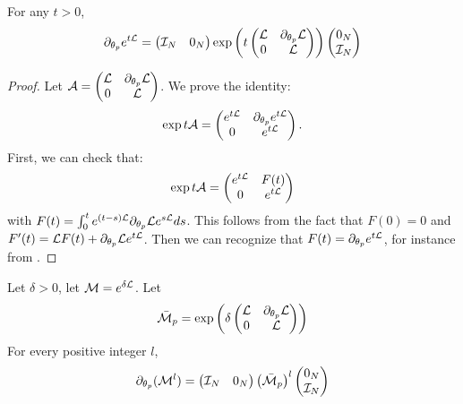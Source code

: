 \documentclass{article}
\begin{document}
\begin{lemma}
For any $t>0$, 
\begin{equation}
\partial_{\theta_p} e^{t{\mathcal L}}
=
\begin{pmatrix}
    {\mathcal I}_N & 0_N
\end{pmatrix}
\exp\left( t
\begin{pmatrix}
    {\mathcal L} &\partial_{\theta_p} {\mathcal L}
    \\
    0&{\mathcal L}
\end{pmatrix}
\right)
\begin{pmatrix}
    0_N 
    \\
    {\mathcal I}_N 
\end{pmatrix}
\end{equation}
\end{lemma}
\begin{proof}
Let ${\mathcal A}=\begin{pmatrix}
    {\mathcal L} &\partial_{\theta_p} {\mathcal L}
    \\
    0&{\mathcal L}
    \end{pmatrix}$.
We prove the identity:
\begin{equation}
    \exp t
    {\mathcal A}
    =
    \begin{pmatrix}
    e^{t{\mathcal L}} &\partial_{\theta_p} e^{t{\mathcal L}}
    \\
    0&e^{t{\mathcal L}}
    \end{pmatrix}.
\end{equation}
First, we can check that: 
\begin{equation}
    \exp t
    {\mathcal A}
    =
    \begin{pmatrix}
    e^{t{\mathcal L}} &F(t)
    \\
    0&e^{t{\mathcal L}}
    \end{pmatrix}
\end{equation}
with $F(t)=\int_0^t e^{(t-s){\mathcal L}}\partial_{\theta_p} {\mathcal L} e^{s{\mathcal L}}ds$.
This follows from the fact that $F(0)=0$ and $F'(t)={\mathcal L} F(t)+\partial_{\theta_p} {\mathcal L} e^{t{\mathcal L}}$.
Then we can recognize that $F(t)=\partial_{\theta_p}e^{t{\mathcal L}}$, for instance from \cite[Equation (2.1)]{Wilcox1967}.
\end{proof}

\begin{corollary}
Let $\delta>0$, let ${\mathcal M}=e^{\delta {\mathcal L}}$. Let 
$$
\bar{{\mathcal M}}_p=\exp\left( \delta
\begin{pmatrix}
    {\mathcal L} &\partial_{\theta_p} {\mathcal L}
    \\
    0&{\mathcal L}
\end{pmatrix}
\right)
$$
For every positive integer $l$,
$$
\partial_{\theta_p}({\mathcal M}^l)
=
\begin{pmatrix}
    {\mathcal I}_N & 0_N
\end{pmatrix}
{\left(\bar{{\mathcal M}}_p\right)}^l
\begin{pmatrix}
    0_N 
    \\
    {\mathcal I}_N 
\end{pmatrix}
$$
\end{corollary}
\end{document}
